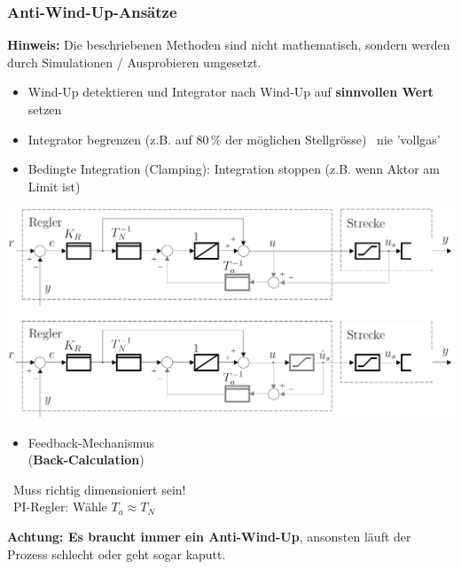 \subsubsection{Anti-Wind-Up-Ansätze}

\textbf{Hinweis:} Die beschriebenen Methoden sind nicht mathematisch, sondern werden durch Simulationen / Ausprobieren umgesetzt.

\begin{itemize}
    \item Wind-Up detektieren und Integrator nach Wind-Up auf \textbf{sinnvollen Wert} setzen
    \item Integrator begrenzen (z.B. auf $80 \, \%$ der möglichen Stellgrösse) \textrightarrow\ nie 'vollgas'
    \item Bedingte Integration (Clamping): Integration stoppen (z.B. wenn Aktor am Limit ist)
\end{itemize}


\begin{minipage}[c]{0.48\columnwidth}
    \includegraphics[width=\columnwidth]{images/anti-wind-up.png}
\end{minipage}
\hfill
\begin{minipage}[c]{0.48\columnwidth}
    \begin{itemize}
        \item Feedback-Mechanismus\\
            (\textbf{Back-Calculation})
    \end{itemize}
    \vspace{0.2cm}

    \textrightarrow\ Muss richtig dimensioniert sein! \\
    \textrightarrow\ PI-Regler: Wähle $T_a \approx T_N$
\end{minipage}

\textbf{Achtung: Es braucht immer ein Anti-Wind-Up}, ansonsten läuft der Prozess schlecht oder geht sogar kaputt.

